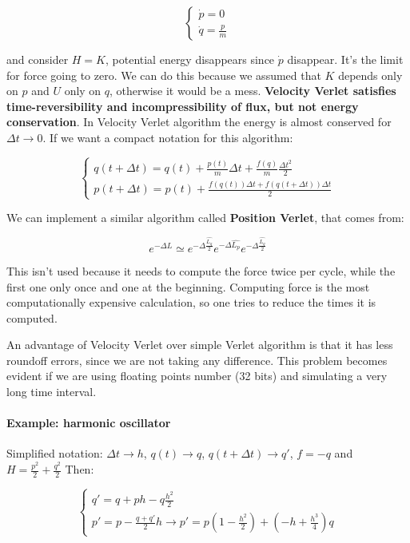 \documentclass[a4paper, italian, openany]{book}
\begin{document}
$$\begin{cases}
\dot{p} = 0 \\
\dot{q} = \frac{p}{m}
\end{cases}$$

and consider $H = K$, potential energy disappears since $\dot{p}$ disappear. It's the limit for force going to zero.\newline
We can do this because we assumed that $K$ depends only on $p$ and $U$ only on $q$, otherwise it would be a mess.\newline
\textbf{Velocity Verlet satisfies time-reversibility and incompressibility of flux, but not energy conservation}. In Velocity Verlet algorithm the energy is almost conserved for $\Delta t \to 0$.\newline
If we want a compact notation for this algorithm:

$$\begin{cases}
q(t + \Delta t) = q(t) + \frac{p(t)}{m} \Delta t + \frac{f(q)}{m} \frac{\Delta t^2}{2}\\
p(t+ \Delta t) = p(t) + \frac{f(q(t))\Delta t + f(q(t+\Delta t))\Delta t}{2}
\end{cases}$$

We can implement a similar algorithm called \textbf{Position Verlet}, that comes from:

$$e^{-\Delta \hat{L}} \simeq e^{-\Delta \frac{\hat{L_q}}{2}} e^{-\Delta \hat{L_p}} e^{-\Delta \frac{\hat{L_q}}{2}}$$

This isn't used because it needs to compute the force twice per cycle, while the first one only once and one at the beginning. Computing force is the most computationally expensive calculation, so one tries to reduce the times it is computed.

An advantage of Velocity Verlet over simple Verlet algorithm is that it has less roundoff errors, since we are not taking any difference. This problem becomes evident if we are using floating points number (32 bits) and simulating a very long time interval.

\paragraph{Example: harmonic oscillator}

Simplified notation: $\Delta t \to h$, $q(t) \to q$, $q(t + \Delta t) \to q'$, $f = -q$ and $H= \frac{p^2}{2} + \frac{q^2}{2}$\newline
Then:

$$\begin{cases}
q' = q +ph - q \frac{h^2}{2}\\
p' = p - \frac{q+q'}{2}h \to p' = p(1-\frac{h^2}{2}) + (-h +\frac{h^3}{4})q
\end{cases}$$
\end{document}
